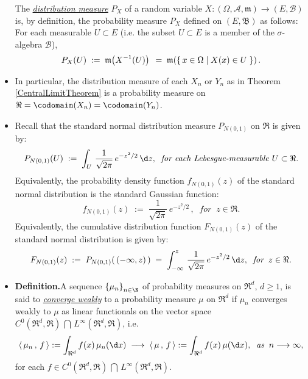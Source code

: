 \documentclass{article}
\begin{document}
\begin{remark}
\begin{itemize}
          The \underline{\emph{distribution measure}} $P_{X}$ of a random variable
          $X : (\Omega,\mathcal{A},\mathfrak{m}) \longrightarrow (E,\mathcal{B})$ is, by definition, the probability measure $P_{X}$ defined
          on $(E,\mathfrak{B})$ as follows:  For each measurable $U \subset E$
          (i.e. the subset $U \subset E$ is a member of the $\sigma$-algebra $\mathcal{B}$),
          \begin{equation*}
          P_{X}(U)
          \; := \; \mathfrak{m}\!\left(X^{-1}(U)\right) \\ 
          \; =  \; \mathfrak{m}\!\left(\left\{\,x\in\Omega\;\vert\;X(x)\in U\;\right\}\right).
          \end{equation*}
\item  In particular, the distribution measure of each $X_{n}$ or $Y_{n}$ as in Theorem \ref{CentralLimitTheorem}
          is a probability measure on $\Re=\codomain(X_{n})=\codomain(Y_{n})$.
\item  Recall that the standard normal distribution measure $P_{N(0,1)}$ on $\Re$ is given by:
          \begin{equation*}
          P_{N(0,1)}\!\left(U\right) \; := \; \int_{U}\, \dfrac{1}{\sqrt{2\pi}}\,e^{-z^{2}/2}\,\d z,
          \;\;\textit{for each Lebesgue-measurable $U \subset \Re$}.
          \end{equation*}
          Equivalently, the probability density function $f_{N(0,1)}(z)$ of the standard normal distribution is the standard Gaussian function:
          \begin{equation*}
          f_{N(0,1)}(z) \; := \; \dfrac{1}{\sqrt{2\pi}}\,e^{-z^{2}/2} \,,
          \;\;\textit{for}\;\; z \in \Re.
          \end{equation*}          
          Equivalently, the cumulative distribution function $F_{N(0,1)}(z)$ of the standard normal distribution is given by:
          \begin{equation*}
          F_{N(0,1)}(z) \; := \; P_{N(0,1)}\!\left(\,(-\infty,z)\,\right) \; = \; \int_{-\infty}^{z}\,\dfrac{1}{\sqrt{2\pi}}\,e^{-z^{2}/2} \, \d z,
          \;\;\textit{for}\;\; z \in \Re.
          \end{equation*}          
\item  \textbf{Definition.}\quad A sequence $\left\{\mu_{n}\right\}_{n\in\N}$ of probability measures on $\Re^{d}$, $d\geq 1$,
          is said to \underline{\emph{converge weakly}} to a probability measure $\mu$ on $\Re^{d}$ if $\mu_{n}$ converges
          weakly to $\mu$ as linear functionals on the vector space $C^{0}(\Re^{d},\Re)\,\bigcap\,L^{\infty}(\Re^{d},\Re)$, i.e.
          \begin{equation*}
          \langle\,\mu_{n}\,,\,f\,\rangle := \int_{\Re^{d}}f(x)\,\mu_{n}(\d x)
          \; \longrightarrow \;
          \langle\,\mu\,,\,f\,\rangle := \int_{\Re^{d}} f(x) \, \mu(\d x),
          \;\;\textit{as}\;\; n \longrightarrow \infty,
          \end{equation*}
          for each $f \in C^{0}(\Re^{d},\Re)\,\bigcap\,L^{\infty}(\Re^{d},\Re)$.
          

\end{itemize}
\end{remark}
\end{document}
